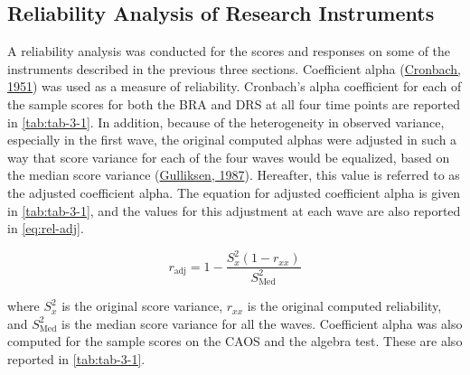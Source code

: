 \documentclass[11pt]{umnthesis}
\begin{document}
\hypertarget{reliability}{%
\subsection{Reliability Analysis of Research Instruments}\label{reliability}}

A reliability analysis was conducted for the scores and responses on some of the instruments described in the previous three sections. Coefficient alpha (\protect\hyperlink{ref-cronbach:1951}{Cronbach, 1951}) was used as a measure of reliability. Cronbach's alpha coefficient for each of the sample scores for both the BRA and DRS at all four time points are reported in \ref{tab:tab-3-1}. In addition, because of the heterogeneity in observed variance, especially in the first wave, the original computed alphas were adjusted in such a way that score variance for each of the four waves would be equalized, based on the median score variance (\protect\hyperlink{ref-gulliksen:1987}{Gulliksen, 1987}). Hereafter, this value is referred to as the adjusted coefficient alpha. The equation for adjusted coefficient alpha is given in \ref{tab:tab-3-1}, and the values for this adjustment at each wave are also reported in \autoref{eq:rel-adj}.

\begin{equation}\label{eq:rel-adj}
r_{\mathrm{adj}} = 1 - \frac{S_x^2(1-r_{xx})}{S^2_{\mathrm{Med}}}
\end{equation}

where \(S_x^2\) is the original score variance, \(r_{xx}\) is the original computed reliability, and \(S^2_{\mathrm{Med}}\) is the median score variance for all the waves. Coefficient alpha was also computed for the sample scores on the CAOS and the algebra test. These are also reported in \ref{tab:tab-3-1}.
\end{document}

